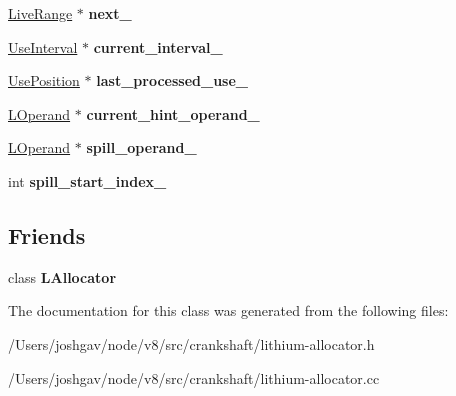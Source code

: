 \begin{DoxyCompactItemize}
\item 
\hyperlink{classv8_1_1internal_1_1_live_range}{Live\+Range} $\ast$ {\bfseries next\+\_\+}\hypertarget{classv8_1_1internal_1_1_live_range_a5f3e50be0fa4ce6fc4a4aada8c7fada7}{}\label{classv8_1_1internal_1_1_live_range_a5f3e50be0fa4ce6fc4a4aada8c7fada7}

\item 
\hyperlink{classv8_1_1internal_1_1_use_interval}{Use\+Interval} $\ast$ {\bfseries current\+\_\+interval\+\_\+}\hypertarget{classv8_1_1internal_1_1_live_range_a756d08de28dfe0ccf52e0cfcdbc4c1c6}{}\label{classv8_1_1internal_1_1_live_range_a756d08de28dfe0ccf52e0cfcdbc4c1c6}

\item 
\hyperlink{classv8_1_1internal_1_1_use_position}{Use\+Position} $\ast$ {\bfseries last\+\_\+processed\+\_\+use\+\_\+}\hypertarget{classv8_1_1internal_1_1_live_range_ae2edb906d915934a9905a95713089912}{}\label{classv8_1_1internal_1_1_live_range_ae2edb906d915934a9905a95713089912}

\item 
\hyperlink{classv8_1_1internal_1_1_l_operand}{L\+Operand} $\ast$ {\bfseries current\+\_\+hint\+\_\+operand\+\_\+}\hypertarget{classv8_1_1internal_1_1_live_range_a53776f4ff869f990b1af7942c0aafd9d}{}\label{classv8_1_1internal_1_1_live_range_a53776f4ff869f990b1af7942c0aafd9d}

\item 
\hyperlink{classv8_1_1internal_1_1_l_operand}{L\+Operand} $\ast$ {\bfseries spill\+\_\+operand\+\_\+}\hypertarget{classv8_1_1internal_1_1_live_range_a59ad80a132252762714279a0c2760376}{}\label{classv8_1_1internal_1_1_live_range_a59ad80a132252762714279a0c2760376}

\item 
int {\bfseries spill\+\_\+start\+\_\+index\+\_\+}\hypertarget{classv8_1_1internal_1_1_live_range_afa560a1b07c3fad398a0f175687822cd}{}\label{classv8_1_1internal_1_1_live_range_afa560a1b07c3fad398a0f175687822cd}

\end{DoxyCompactItemize}
\subsection*{Friends}
\begin{DoxyCompactItemize}
\item 
class {\bfseries L\+Allocator}\hypertarget{classv8_1_1internal_1_1_live_range_a03aab58a5f603779841a2e424ef17d75}{}\label{classv8_1_1internal_1_1_live_range_a03aab58a5f603779841a2e424ef17d75}

\end{DoxyCompactItemize}


The documentation for this class was generated from the following files\+:\begin{DoxyCompactItemize}
\item 
/\+Users/joshgav/node/v8/src/crankshaft/lithium-\/allocator.\+h\item 
/\+Users/joshgav/node/v8/src/crankshaft/lithium-\/allocator.\+cc\end{DoxyCompactItemize}
